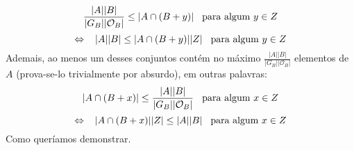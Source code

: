 $$\frac{|A||B|}{|G_B||\mathcal{O}_B|}\le |A\cap (B+y)|\hspace{0.3cm} \text{para algum $y\in Z$}$$
$$\Leftrightarrow \hspace{0.3cm} |A||B|\le |A\cap (B+y)||Z|\hspace{0.3cm} \text{para algum $y\in Z$}$$
Ademais, ao menos um desses conjuntos contém no máximo $\frac{|A||B|}{|G_B||\mathcal{O}_B|}$ elementos de $A$ (prova-se-lo trivialmente por absurdo), em outras palavras:
$$|A\cap (B+x)|\le \frac{|A||B|}{|G_B||\mathcal{O}_B|}\hspace{0.3cm} \text{para algum $x\in Z$}$$
$$\Leftrightarrow \hspace{0.3cm}|A\cap (B+x)||Z|\le |A||B|\hspace{0.3cm} \text{para algum $x\in Z$}$$
Como queríamos demonstrar.